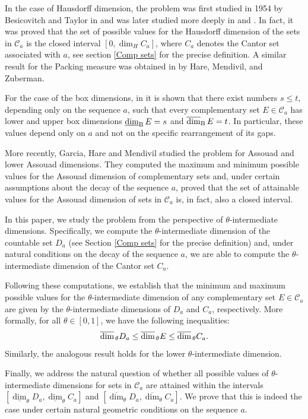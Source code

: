 \documentclass[11pt,reqno,bookmarksnumbered,raiselinks,breaklinks,colorlinks,plainpages]{amsart}
\newcommand\ubd{\overline{\mbox{\rm dim}}_{\rm B}\,} %
\newcommand\lbd{\underline{\mbox{\rm dim}}_{\rm B}\,} %
\newcommand\uda{\overline{\mbox{\rm dim}}_{\,\theta}} %
\begin{document}
In the case of Hausdorff dimension, the problem was first studied in 1954 by Besicovitch and Taylor in \cite{BeyTa} and was later studied more deeply in \cite{cabrelli2010classifying} and \cite{garcia2007dimension}. In fact, it was proved that the set of possible values for the Hausdorff dimension of the sets in $\mathcal{C}_a$ is the closed interval $[0,\dim_H C_{a}]$, where $C_{a}$ denotes the Cantor set associated with $a$, see section \ref{Comp sets} for the precise definition. A similar result for the Packing measure was obtained in \cite{hare2013sizes} by Hare, Mendivil, and Zuberman.

  For the case of the box dimensions, in \cite[Chapter 3.2]{falconer1997techniques} it is shown that there exist numbers $s \leq t$, depending only on the sequence $a$, such that every complementary set $E \in \mathcal{C}_a$ has lower and upper box dimensions $
\lbd E = s $ and  $\ubd E = t$.
In particular, these values depend only on $a$ and not on the specific rearrangement of its gaps.

 More recently, Garcia, Hare and Mendivil studied the problem for Assouad and lower Assouad dimensions. They computed the maximum and minimum possible values for the Assouad dimension of complementary sets and, under certain assumptions about the decay of the sequence $a$, proved that the set of attainable values for the Assouad dimension of sets in $\mathcal{C}_a$ is, in fact, also a closed interval.

In this paper, we study the problem from the perspective of $\theta$-intermediate dimensions. Specifically, we compute the $\theta$-intermediate dimension of the countable set $D_a$ (see Section \ref{Comp sets} for the precise definition) and, under natural conditions on the decay of the sequence $a$, we are able to compute the $\theta$-intermediate dimension of the Cantor set $C_a$. 

Following these computations, we establish that the minimum and maximum possible values for the $\theta$-intermediate dimension of any complementary set $E \in \mathcal{C}_a$ are given by the $\theta$-intermediate dimensions of $D_a$ and $C_a$, respectively. More formally, for all $\theta \in [0, 1]$, we have the following inequalities:
$$\uda D_a \leq \uda E \leq \uda C_a.$$ Similarly, the analogous result holds for the lower $\theta$-intermediate dimension.

Finally, we address the natural question of whether all possible values of $\theta$-intermediate dimensions for sets in $\mathcal{C}_a$ are attained within the intervals $[\underline{\dim}_\theta D_a, \underline{\dim}_\theta C_a]$ and $[\overline{\dim}_\theta D_a, \overline{\dim}_\theta C_a]$. We prove that this is indeed the case under certain natural geometric conditions on the sequence $a$.
\end{document}
